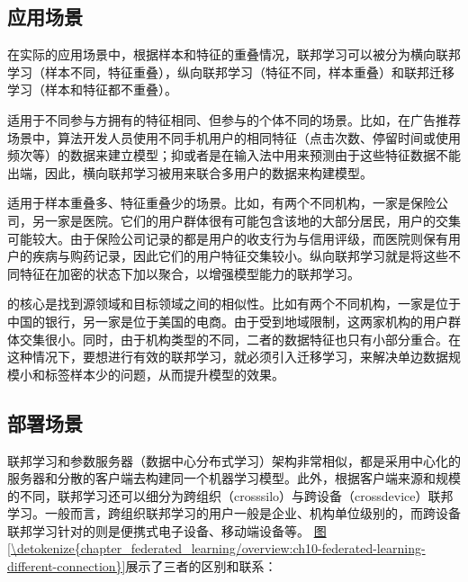 \documentclass[letterpaper,10pt,english]{sphinxmanual}
\begin{document}
\subsection{应用场景}
\label{\detokenize{chapter_federated_learning/overview:id3}}
\sphinxAtStartPar
在实际的应用场景中，根据样本和特征的重叠情况，联邦学习可以被分为横向联邦学习（样本不同，特征重叠），纵向联邦学习（特征不同，样本重叠）和联邦迁移学习（样本和特征都不重叠）。

\sphinxAtStartPar
{}适用于不同参与方拥有的特征相同、但参与的个体不同的场景。比如，在广告推荐场景中，算法开发人员使用不同手机用户的相同特征（点击次数、停留时间或使用频次等）的数据来建立模型；抑或者是在输入法中用来预测由于这些特征数据不能出端，因此，横向联邦学习被用来联合多用户的数据来构建模型。

\sphinxAtStartPar
{}适用于样本重叠多、特征重叠少的场景。比如，有两个不同机构，一家是保险公司，另一家是医院。它们的用户群体很有可能包含该地的大部分居民，用户的交集可能较大。由于保险公司记录的都是用户的收支行为与信用评级，而医院则保有用户的疾病与购药记录，因此它们的用户特征交集较小。纵向联邦学习就是将这些不同特征在加密的状态下加以聚合，以增强模型能力的联邦学习。

\sphinxAtStartPar
{}的核心是找到源领域和目标领域之间的相似性。比如有两个不同机构，一家是位于中国的银行，另一家是位于美国的电商。由于受到地域限制，这两家机构的用户群体交集很小。同时，由于机构类型的不同，二者的数据特征也只有小部分重合。在这种情况下，要想进行有效的联邦学习，就必须引入迁移学习，来解决单边数据规模小和标签样本少的问题，从而提升模型的效果。


\subsection{部署场景}
\label{\detokenize{chapter_federated_learning/overview:id4}}
\sphinxAtStartPar
联邦学习和参数服务器（数据中心分布式学习）架构非常相似，都是采用中心化的服务器和分散的客户端去构建同一个机器学习模型。此外，根据客户端来源和规模的不同，联邦学习还可以细分为跨组织（cross\sphinxhyphen{}silo）与跨设备（cross\sphinxhyphen{}device）联邦学习。一般而言，跨组织联邦学习的用户一般是企业、机构单位级别的，而跨设备联邦学习针对的则是便携式电子设备、移动端设备等。
\hyperref[\detokenize{chapter_federated_learning/overview:ch10-federated-learning-different-connection}]{图\ref{\detokenize{chapter_federated_learning/overview:ch10-federated-learning-different-connection}}}展示了三者的区别和联系：
\end{document}
